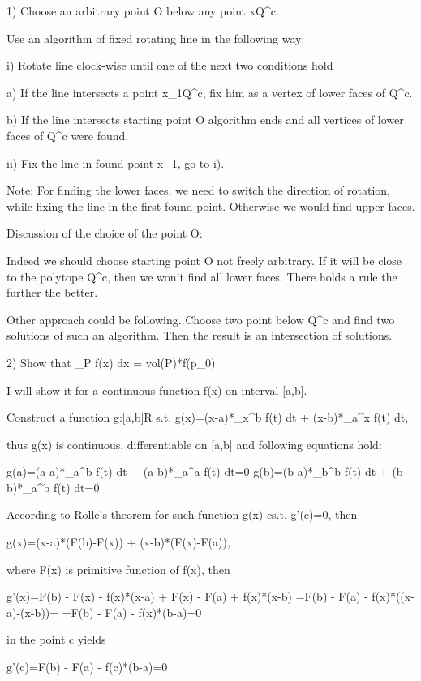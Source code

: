 1) 	Choose an arbitrary point O below any point x\in Q^c.
	
	Use an algorithm of fixed rotating line in the following way:
	
	i) Rotate line clock-wise until one of the next two conditions hold
		
		a) If the line intersects a point x_1\in Q^c, fix him as a vertex of lower faces of Q^c.
		
		b) If the line intersects starting point O algorithm ends and all vertices of lower faces of Q^c were found.
		
	ii)	Fix the line in found point x_1, go to i).
	
		Note: For finding the lower faces, we need to switch the direction of rotation, while fixing the line in the first found point. Otherwise we would find upper faces.
		
	Discussion of the choice of the point O:
	
		Indeed we should choose starting point O not freely arbitrary. If it will be close to the polytope Q^c, then we won't find all lower faces. There holds a rule the further the better.
		
		Other approach could be following. Choose two point below Q^c and find two solutions of such an algorithm. Then the result is an intersection of solutions.
				
2)	 Show that \int_P f(x) dx = vol(P)*f(p_0)

	I will show it for a continuous function f(x) on interval [a,b].
	
	Construct a function g:[a,b]\to R s.t. 
	g(x)=(x-a)*\int_{x}^{b} f(t) dt + (x-b)*\int_{a}^{x} f(t) dt,
	
	thus g(x) is continuous, differentiable on [a,b] and following equations hold:
	
	g(a)=(a-a)*\int_{a}^{b} f(t) dt + (a-b)*\int_{a}^{a} f(t) dt=0
	g(b)=(b-a)*\int_{b}^{b} f(t) dt + (b-b)*\int_{a}^{b} f(t) dt=0
	
	According to Rolle's theorem for such function g(x) \exists c\in[a,b] s.t. g'(c)=0, then
	
	g(x)=(x-a)*(F(b)-F(x)) + (x-b)*(F(x)-F(a)),
	
	where F(x) is primitive function of f(x), then
	
	g'(x)=F(b) - F(x) - f(x)*(x-a) + F(x) - F(a) + f(x)*(x-b)
		 =F(b) - F(a) - f(x)*((x-a)-(x-b))=
		 =F(b) - F(a) - f(x)*(b-a)=0
		 
	in the point c yields
	
	g'(c)=F(b) - F(a) - f(c)*(b-a)=0
	
